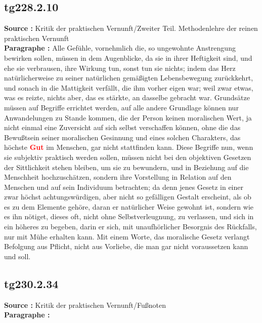 \documentclass[a4paper,12pt,twoside]{book}
\newcommand{\match}[1]{\textcolor{red}{\textbf{#1}}}
\begin{document}
	\subsection*{tg228.2.10} 
	\textbf{Source : }Kritik der praktischen Vernunft/Zweiter Teil. Methodenlehre der reinen praktischen Vernunft\\  
	
	\textbf{Paragraphe : }Alle Gefühle, vornehmlich die, so ungewohnte Anstrengung bewirken sollen, müssen in dem Augenblicke, da sie in ihrer Heftigkeit sind, und ehe sie verbrausen, ihre Wirkung tun, sonst tun sie nichts; indem das Herz natürlicherweise zu seiner natürlichen gemäßigten Lebensbewegung zurückkehrt, und sonach in die Mattigkeit verfällt, die ihm vorher eigen war; weil zwar etwas, was es reizte, nichts aber, das es stärkte, an dasselbe gebracht war. Grundsätze müssen auf Begriffe errichtet werden, auf alle andere Grundlage können nur Anwandelungen zu Stande kommen, die der Person keinen moralischen Wert, ja nicht einmal eine Zuversicht auf sich selbst verschaffen können, ohne die das Bewußtsein seiner moralischen Gesinnung und eines solchen Charakters, das höchste \match{Gut} im Menschen, gar nicht stattfinden  kann. Diese Begriffe nun, wenn sie subjektiv praktisch werden sollen, müssen nicht bei den objektiven Gesetzen der Sittlichkeit stehen bleiben, um sie zu bewundern, und in Beziehung auf die Menschheit hochzuschätzen, sondern ihre Vorstellung in Relation auf den Menschen und auf sein Individuum betrachten; da denn jenes Gesetz in einer zwar höchst achtungswürdigen, aber nicht so gefälligen Gestalt erscheint, als ob es zu dem Elemente gehöre, daran er natürlicher Weise gewohnt ist, sondern wie es ihn nötiget, dieses oft, nicht ohne Selbstverleugnung, zu verlassen, und sich in ein höheres zu begeben, darin er sich, mit unaufhörlicher Besorgnis des Rückfalls, nur mit Mühe erhalten kann. Mit einem Worte, das moralische Gesetz verlangt Befolgung aus Pflicht, nicht aus Vorliebe, die man gar nicht voraussetzen kann und soll. 
	
	\subsection*{tg230.2.34} 
	\textbf{Source : }Kritik der praktischen Vernunft/Fußnoten\\  
	
	\textbf{Paragraphe : }
	
\end{document}

